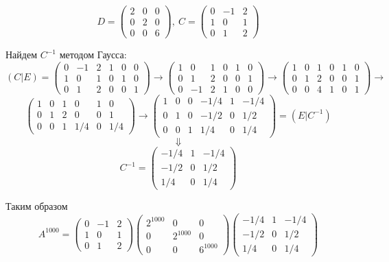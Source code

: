 \documentclass{article}
\begin{document}
$$D=\left(\begin{array}{rrr}2 & 0 & 0\\0 & 2 & 0\\0 & 0 & 6\end{array}\right),\ C=\left(\begin{array}{rrr}0 & -1 & 2\\1 & 0 & 1\\0 & 1 & 2\end{array}\right)$$
\par
Найдем $C^{-1}$ методом Гаусса:
$$(C|E)=\left(\begin{array}{rrr|rrr}0 & -1 & 2 & 1 & 0 & 0\\1 & 0 & 1 & 0 & 1 & 0\\0 & 1 & 2 & 0 & 0 & 1\end{array}\right)\rightarrow\left(\begin{array}{rrr|rrr}1 & 0 & 1 & 0 & 1 & 0\\0 & 1 & 2 & 0 & 0 & 1\\0 & -1 & 2 & 1 & 0 & 0\end{array}\right)\rightarrow\left(\begin{array}{rrr|rrr}1 & 0 & 1 & 0 & 1 & 0\\0 & 1 & 2 & 0 & 0 & 1\\0 & 0 & 4 & 1 & 0 & 1\end{array}\right)\rightarrow$$
$$\left(\begin{array}{rrr|rrr}1 & 0 & 1 & 0 & 1 & 0\\0 & 1 & 2 & 0 & 0 & 1\\0 & 0 & 1 & 1/4 & 0 & 1/4\end{array}\right)\rightarrow\left(\begin{array}{rrr|rrr}1 & 0 & 0 & -1/4 & 1 & -1/4\\0 & 1 & 0 & -1/2 & 0 & 1/2\\0 & 0 & 1 & 1/4 & 0 & 1/4\end{array}\right)=(E|C^{-1})$$
$$\Downarrow$$
$$C^{-1}=\left(\begin{array}{rrr}-1/4 & 1 & -1/4\\-1/2 & 0 & 1/2\\1/4 & 0 & 1/4\end{array}\right)$$
\par
Таким образом
$$A^{1000}=\left(\begin{array}{rrr}0 & -1 & 2\\1 & 0 & 1\\0 & 1 & 2\end{array}\right)\left(\begin{array}{ccc}2^{1000} & 0 & 0\\0 & 2^{1000} & 0\\0 & 0 & 6^{1000}\end{array}\right)\left(\begin{array}{rrr}-1/4 & 1 & -1/4\\-1/2 & 0 & 1/2\\1/4 & 0 & 1/4\end{array}\right)$$
\end{document}
